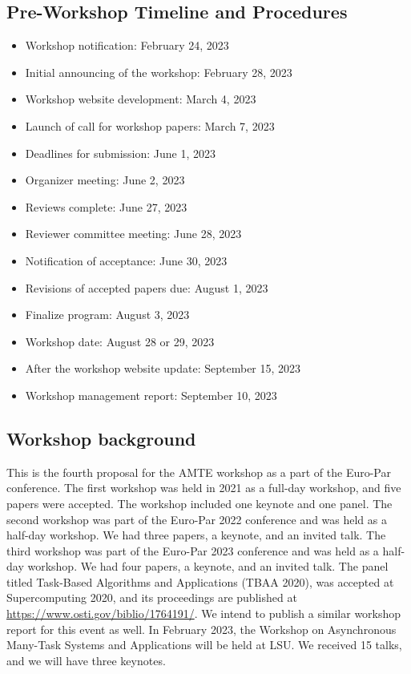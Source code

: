\documentclass{article}
\begin{document}
\subsection*{Pre-Workshop Timeline and Procedures}
\begin{itemize}
    \item Workshop notification: February 24, 2023
    \item Initial announcing of the workshop: February 28, 2023
    \item Workshop website development: March 4, 2023
    \item Launch of call for workshop papers: March 7, 2023
    \item Deadlines for submission: June 1, 2023
    \item Organizer meeting: June 2, 2023
    \item Reviews complete: June 27, 2023
    \item Reviewer committee meeting: June 28, 2023
    \item Notification of acceptance: June 30, 2023
    \item Revisions of accepted papers due: August 1, 2023
    \item Finalize program: August 3, 2023
    \item Workshop date: August 28 or 29, 2023
    \item After the workshop website update: September 15, 2023
    \item Workshop management report: September 10, 2023
\end{itemize}

\subsection*{Workshop background}
This is the fourth proposal for the AMTE workshop as a part of the Euro-Par conference. The first workshop was held in 2021 as a full-day workshop, and five papers were accepted. The workshop included one keynote and one panel. The second workshop was part of the Euro-Par 2022 conference and was held as a half-day workshop. We had three papers, a keynote, and an invited talk. The third workshop was part of the Euro-Par 2023 conference and was held as a half-day workshop. We had four papers, a keynote, and an invited talk. The panel titled Task-Based Algorithms and Applications (TBAA 2020), was accepted at Supercomputing 2020, and its proceedings are published at \url{https://www.osti.gov/biblio/1764191/}. We intend to publish a similar workshop report for this event as well. In February 2023, the Workshop on Asynchronous Many-Task Systems and Applications will be held at LSU. We received 15 talks, and we will have three keynotes.
\end{document}
